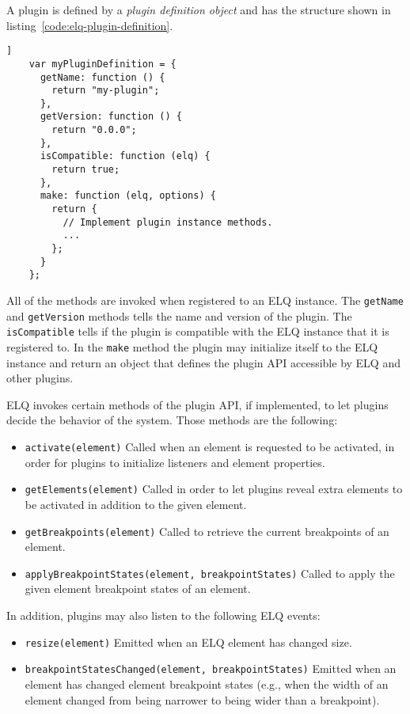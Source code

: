 \documentclass{acm_proc_article-sp}
\newcommand{\code}[1]{\texttt{#1}}
\newcommand{\elq}{ELQ}
\begin{document}
  A plugin is defined by a \emph{plugin definition object} and has the structure shown in listing~\ref{code:elq-plugin-definition}.
  \begin{lstlisting}[gobble=4,caption={The structure of plugin definition objects.},captionpos=b,label={code:elq-plugin-definition}]]
    var myPluginDefinition = {
      getName: function () {
        return "my-plugin";
      },
      getVersion: function () {
        return "0.0.0";
      },
      isCompatible: function (elq) {
        return true;
      },
      make: function (elq, options) {
        return {
          // Implement plugin instance methods.
          ...
        };
      }
    };
  \end{lstlisting}

  All of the methods are invoked when registered to an \elq{} instance.
  The \code{getName} and \code{getVersion} methods tells the name and version of the plugin.
  The \code{isCompatible} tells if the plugin is compatible with the \elq{} instance that it is registered to.
  In the \code{make} method the plugin may initialize itself to the \elq{} instance and return an object that defines the plugin API accessible by \elq{} and other plugins.

  \elq{} invokes certain methods of the plugin API, if implemented, to let plugins decide the behavior of the system.
  Those methods are the following:
  \begin{itemize}
    \item \code{activate(element)}
          Called when an element is requested to be activated, in order for plugins to initialize listeners and element properties.
    \item \code{getElements(element)}
          Called in order to let plugins reveal extra elements to be activated in addition to the given element.
    \item \code{getBreakpoints(element)}
          Called to retrieve the current breakpoints of an element.
    \item \code{applyBreakpointStates(element, breakpointStates)}
          Called to apply the given element breakpoint states of an element.
  \end{itemize}

  In addition, plugins may also listen to the following \elq{} events:
  \begin{itemize}
    \item \code{resize(element)}
          Emitted when an \elq{} element has changed size.
    \item \code{breakpointStatesChanged(element, breakpointStates)}
          Emitted when an element has changed element breakpoint states (e.g., when the width of an element changed from being narrower to being wider than a breakpoint).
  \end{itemize}
\end{document}
